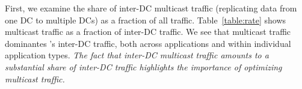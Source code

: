 First, we examine the share of inter-DC multicast traffic
(replicating data from one DC to multiple DCs)
as a fraction of all traffic.
Table~\ref{table:rate} shows multicast traffic as
a fraction of inter-DC traffic.
We see that multicast traffic dominantes \company's
inter-DC traffic, both across applications and
within individual application types.
{\em The fact that inter-DC multicast traffic
amounts to a substantial share of inter-DC traffic
highlights the importance of optimizing multicast
traffic.}

